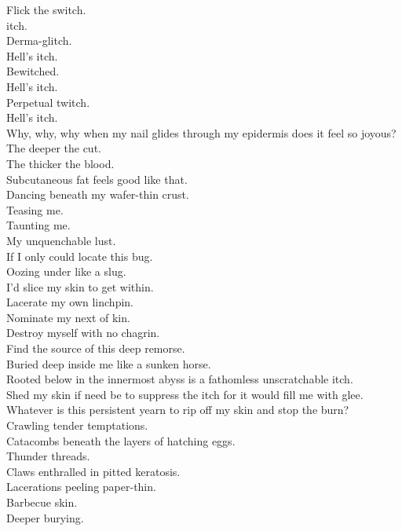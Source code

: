 


Flick the switch. \\
 itch. \\
Derma-glitch. \\
Hell's itch. \\
Bewitched. \\
Hell's itch. \\
Perpetual twitch. \\
Hell's itch. \\

Why, why, why when my nail glides through my epidermis does it feel so joyous? \\
The deeper the cut. \\
The thicker the blood. \\
Subcutaneous fat feels good like that. \\
Dancing beneath my wafer-thin crust. \\
Teasing me. \\
Taunting me. \\
My unquenchable lust. \\
If I only could locate this bug. \\
Oozing under like a slug. \\
I'd slice my skin to get within. \\
Lacerate my own linchpin. \\
Nominate my next of kin. \\
Destroy myself with no chagrin. \\
Find the source of this deep remorse. \\
Buried deep inside me like a sunken horse. \\
Rooted below in the innermost abyss is a fathomless unscratchable itch. \\

Shed my skin if need be to suppress the itch for it would fill me with glee. \\
Whatever is this persistent yearn to rip off my skin and stop the burn? \\
Crawling tender temptations. \\
Catacombs beneath the layers of hatching eggs. \\
Thunder threads. \\
Claws enthralled in pitted keratosis. \\
Lacerations peeling paper-thin. \\
Barbecue skin. \\
Deeper burying. \\

